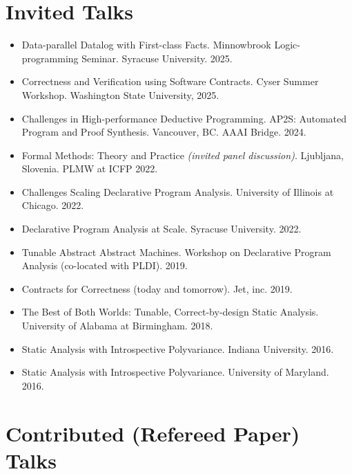 \documentclass[line]{res}
\begin{document}
\begin{resume}
\section{\large Invited Talks} \vspace{0.2in}
\begin{itemize}
\item Data-parallel Datalog with First-class Facts. Minnowbrook Logic-programming Seminar. Syracuse University. 2025.
\item Correctness and Verification using Software Contracts. Cyser Summer Workshop. Washington State University, 2025.
\item Challenges in High-performance Deductive Programming. AP2S: Automated Program and Proof Synthesis. Vancouver, BC. AAAI Bridge. 2024. 
\item Formal Methods: Theory and Practice \textit{(invited panel discussion)}. Ljubljana, Slovenia. PLMW at ICFP 2022.
\item Challenges Scaling Declarative Program Analysis. University of Illinois at Chicago. 2022.
\item Declarative Program Analysis at Scale. Syracuse University. 2022.
\item Tunable Abstract Abstract Machines. Workshop on Declarative Program Analysis (co-located with PLDI). 2019.
\item Contracts for Correctness (today and tomorrow). Jet, inc. 2019.
\item The Best of Both Worlds: Tunable, Correct-by-design Static Analysis. University of Alabama at Birmingham. 2018.
\item Static Analysis with Introspective Polyvariance. Indiana University. 2016.
\item Static Analysis with Introspective Polyvariance. University of Maryland. 2016.
\end{itemize}

\section{\large Contributed (Refereed Paper) Talks} \vspace{0.2in}



\end{resume}

\end{document}
